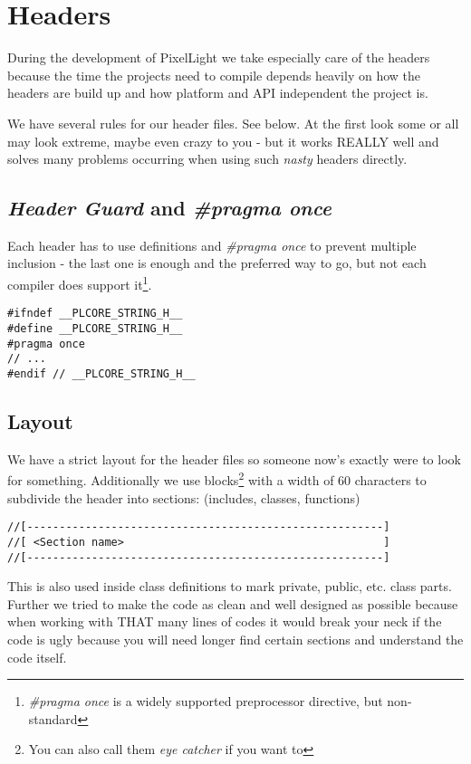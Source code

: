 \chapter{Headers}
During the development of PixelLight we take especially care of the headers because the time the projects need to compile depends heavily on how the headers are build up and how platform and API independent the project is.

We have several rules for our header files. See below. At the first look some or all may look extreme, maybe even crazy to you - but it works REALLY well and solves many problems occurring when using such \emph{nasty} headers directly.




\section{\emph{Header Guard} and \emph{\#pragma once}}
Each header has to use definitions and \emph{\#pragma once} to prevent multiple inclusion - the last one is enough and the preferred way to go, but not each compiler does support it\footnote{\emph{\#pragma once} is a widely supported preprocessor directive, but non-standard}.

\begin{lstlisting}[caption=Header guard]
#ifndef __PLCORE_STRING_H__
#define __PLCORE_STRING_H__
#pragma once
// ...
#endif // __PLCORE_STRING_H__
\end{lstlisting}




\section{Layout}
We have a strict layout for the header files so someone now's exactly were to look for something. Additionally we use blocks\footnote{You can also call them \emph{eye catcher} if you want to} with a width of 60 characters to subdivide the header into sections: (includes, classes, functions)

\begin{lstlisting}[caption=Code section comment blocks]
//[-------------------------------------------------------]
//[ <Section name>                                        ]
//[-------------------------------------------------------]
\end{lstlisting}

This is also used inside class definitions to mark private, public, etc. class parts. Further we tried to make the code as clean and well designed as possible because when working with THAT many lines of codes it would break your neck if the code is ugly because you will need longer find certain sections and understand the code itself.

